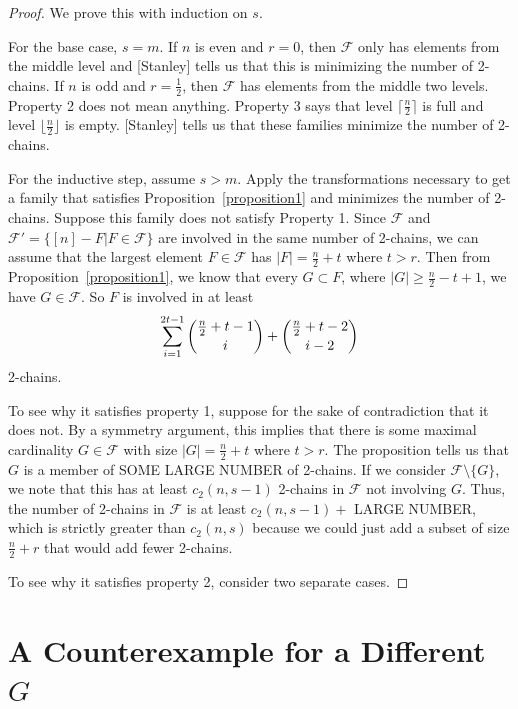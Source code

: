 \documentclass[12pt]{article}
\theoremstyle{plain}
\theoremstyle{definition}
\theoremstyle{remark}
\newcommand{\F}{\mathcal{F}}
\begin{document}
\begin{proof}
We prove this with induction on $s$.

For the base case, $s = m$. If $n$ is even and $r = 0$, then $\F$ only has elements from the middle level and [Stanley] tells us that this is minimizing the number of 2-chains. If $n$ is odd and $r = \frac{1}{2}$, then $\F$ has elements from the middle two levels. Property 2 does not mean anything. Property 3 says that level $\lceil \frac{n}{2} \rceil$ is full and level $\lfloor \frac{n}{2} \rfloor$ is empty. [Stanley] tells us that these families minimize the number of 2-chains. 

For the inductive step, assume $s > m$. Apply the transformations necessary to get a family that satisfies Proposition~\ref{proposition1} and minimizes the number of 2-chains. Suppose this family does not satisfy Property 1. Since $\F$ and $\F' = \{ [n] - F | F \in \F \}$ are involved in the same number of 2-chains, we can assume that the largest element $F \in \F$ has $|F| = \frac{n}{2} + t$ where $t > r$. Then from Proposition~\ref{proposition1}, we know that every $G \subset F$, where $|G| \geq \frac{n}{2}-t+1$, we have $G \in \F$. So $F$ is involved in at least
\[ \sum_{i=1}^{2t-1} \dbinom{\frac{n}{2}+t - 1}{i} + \dbinom{\frac{n}{2}+t-2}{i-2}\]
2-chains. 

To see why it satisfies property 1, suppose for the sake of contradiction that it does not. By a symmetry argument, this implies that there is some maximal cardinality $G \in \F$ with size $|G| = \frac{n}{2} + t$ where $t > r$. The proposition tells us that $G$ is a member of SOME LARGE NUMBER of 2-chains. If we consider $\F \setminus \{G\}$, we note that this has at least $c_2(n,s-1)$ 2-chains in $\F$ not involving $G$. Thus, the number of 2-chains in $\F$ is at least $c_2(n,s-1) + $ LARGE NUMBER, which is strictly greater than $c_2(n,s)$ because we could just add a subset of size $\frac{n}{2} + r$ that would add fewer 2-chains.

To see why it satisfies property 2, consider two separate cases. 

\end{proof}

\section{A Counterexample for a Different $G$}
\end{document}

